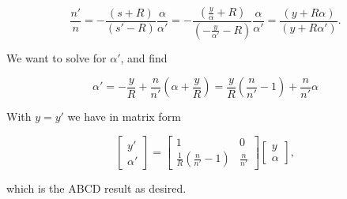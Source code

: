 {\begin{dmath}\label{eqn:convexNonParaxial:200}
\frac{n'}{n}
=
-\frac{
(s + R)
}
{
(s' - R)
}
\frac{
\alpha
}
{
\alpha'
}
=
-\frac{
\left( \frac{y}{\alpha} + R \right)
}
{
\left(-\frac{y}{\alpha'} - R \right)
}
\frac{
\alpha
}
{
\alpha'
}
=
\frac{
\left( y + R \alpha \right)
}
{
\left( y + R \alpha' \right)
}.
\end{dmath}

We want to solve for $\alpha'$, and find

\begin{dmath}\label{eqn:convexNonParaxial:220}
\alpha' 
= -\frac{y}{R} + \frac{n}{n'} \left( \alpha + \frac{y}{R} \right) 
= \frac{y}{R} \left( \frac{n}{n'} - 1 \right) + \frac{n}{n'} \alpha
\end{dmath}

With $y = y'$ we have in matrix form 

\begin{dmath}\label{eqn:convexNonParaxial:240}
\boxed{
\begin{bmatrix}
y' \\
\alpha '
\end{bmatrix}
=
\begin{bmatrix}
1 & 0 \\
\frac{1}{R} \left( \frac{n}{n'} - 1 \right) & \frac{n}{n'} 
\end{bmatrix}
\begin{bmatrix}
y \\
\alpha 
\end{bmatrix},
}
\end{dmath}

which is the ABCD result as desired.
}

\EndNoBibArticle
